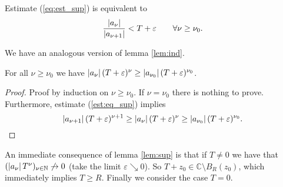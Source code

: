 \begin{enumerate}[label = \textbf{Exercise \arabic*.},wide = 0pt, itemsep=1.5ex]
		Estimate (\ref{eq:est_sup}) is equivalent to
		\begin{equation}
			\frac{\abs[0]{a_\nu}}{\abs[0]{a_{\nu + 1}}} < T + \varepsilon \qquad \forall \nu \geq \nu_0.
			\label{est:eq_sup}
		\end{equation}

		We have an analogous version of lemma \ref{lem:ind}.
		\begin{lemma}
			For all $\nu \geq \nu_0$ we have $\abs[0]{a_\nu}(T + \varepsilon)^\nu \geq \abs[0]{a_{\nu_0}}(T + \varepsilon)^{\nu_0}$.
			\label{lem:sup}
		\end{lemma}

		\begin{proof}
			Proof by induction on $\nu \geq \nu_0$. If $\nu = \nu_0$ there is nothing to prove. Furthermore, estimate (\ref{est:eq_sup}) implies
			\begin{equation}
				\abs[0]{a_{\nu + 1}}(T + \varepsilon)^{\nu + 1} \geq \abs[0]{a_{\nu}}(T + \varepsilon)^{\nu} \geq \abs[0]{a_{\nu_0}}(T + \varepsilon)^{\nu_0}.
			\end{equation}
		\end{proof} 

		An immediate consequence of lemma \ref{lem:sup} is that if $T \neq 0$ we have that $(\abs[0]{a_\nu}T^\nu)_{\nu \in \mathbb{N}} \not\to 0$ (take the limit $\varepsilon \searrow 0$). So $T + z_0 \in \mathbb{C} \setminus B_R(z_0)$, which immediately implies $T \geq R$. Finally we consider the case $T = 0$.

\end{enumerate}
\printbibliography

